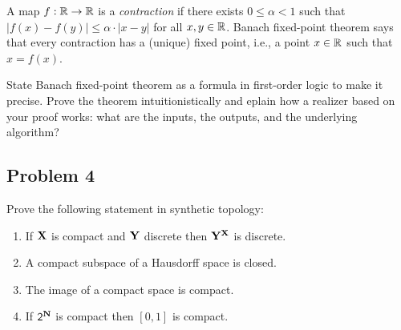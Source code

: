\documentclass[a4paper,11pt]{article}
\begin{document}
A map $f : \mathbb{R} \to \mathbb{R}$ is a \emph{contraction} if there exists $0
\leq \alpha < 1$ such that $|f(x) - f(y)| \leq \alpha \cdot |x - y|$
for all $x, y \in \mathbb{R}$. Banach fixed-point theorem says that every
contraction has a (unique) fixed point, i.e., a point $x \in \mathbb{R}$ such
that $x = f(x)$.

State Banach fixed-point theorem as a formula in first-order logic to
make it precise. Prove the theorem intuitionistically and eplain how
a realizer based on your proof works: what are the inputs, the
outputs, and the underlying algorithm?


\subsection*{Problem 4}

Prove the following statement in synthetic topology:
%
\begin{enumerate}
\item If $\mathbf{X}$ is compact and $\mathbf{Y}$ discrete then
  $\mathbf{Y}^{\mathbf{X}}$ is discrete.
\item A compact subspace of a Hausdorff space is closed.
\item The image of a compact space is compact.
\item If $\mathsf{2}^{\mathbf{N}}$ is compact then $[0,1]$ is compact.
\end{enumerate}
\end{document}

